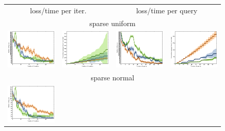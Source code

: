 \documentclass{article}
\renewcommand\[{\begin{equation}}
\renewcommand\]{\end{equation}}
\begin{document}
\begin{figure}[b]
    \centering
    {\footnotesize
    \begin{tabular}{cccc}
        \hline
        \multicolumn{2}{c}{{\sc loss/time per iter.}} &
        \multicolumn{2}{c}{{\sc loss/time per query}}
        \\
        \multicolumn{4}{c}{{\sc sparse uniform}}
        \\
        \includegraphics[width=10em]{figures/pc_with_costs_uniform_sparse_per_iter_loss} &
        \includegraphics[width=10em]{figures/pc_with_costs_uniform_sparse_per_iter_time} &
        \includegraphics[width=10em]{figures/pc_with_costs_uniform_sparse_per_query_loss} &
        \includegraphics[width=10em]{figures/pc_with_costs_uniform_sparse_per_query_time}
        \\
        \hline
        \multicolumn{4}{c}{{\sc sparse normal}}
        \\
        \includegraphics[width=10em]{figures/pc_with_costs_normal_sparse_per_iter_loss} &

\end{tabular}}
\end{figure}
\end{document}
